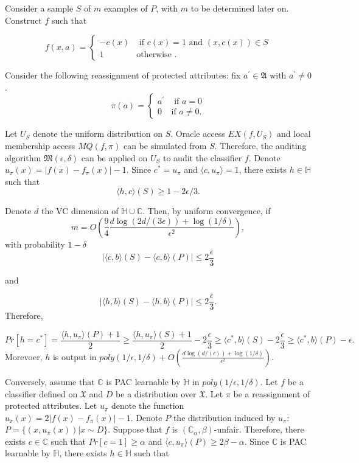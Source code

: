 \documentclass{article}
\begin{document}
\bigskip
Consider a sample $S$ of $m$ examples of $P$, with $m$ to be determined later on. Construct $f$ such that

\begin{equation}
    f(x, a) = \begin{cases}
    -c(x) & \mbox{ if } c(x)=1 \mbox{ and } (x, c(x))\in S  \\
    1 & \mbox{otherwise }.
    \end{cases}
\end{equation}

Consider the following reassignment of protected attributes: fix $a^{'}\in \mathfrak{A}$ with $a^{'}\neq 0$.
\begin{equation}
    \pi(a) = \begin{cases}
    a^{'} & \mbox{ if } a=0  \\
    0 & \mbox{if } a\neq 0.
    \end{cases}
\end{equation}

Let $U_{S}$ denote the uniform distribution on $S$. Oracle access $EX(f, U_{S})$ and local membership access $MQ(f, \pi)$ can be simulated from $S$. Therefore, the auditing algorithm $\mathfrak{M}(\epsilon, \delta)$ can be applied on $U_{S}$ to audit the classifier $f$. Denote $u_{\pi}(x)=|f(x)-f_{\pi}(x)| -1$. Since $c^{*}=u_{\pi}$ and $\langle c, u_{\pi}\rangle =1$, there exists $h\in \mathbb{H}$ such that $$\langle h, c\rangle(S) \geq 1 -2\epsilon/3.$$ 

\bigskip
Denote $d$ the VC dimension of $\mathbb{H}\cup\mathbb{C}$. Then, by uniform convergence, if $$m=O\left(\frac{9}{4}\frac{d\log(2d/(3\epsilon)) + \log(1/\delta)}{\epsilon^{2}}\right),$$
with probability $1-\delta$
$$|\langle c, b\rangle(S) - \langle c, b\rangle(P)| \leq 2\frac{\epsilon}{3} $$

and

$$|\langle h, b\rangle(S) - \langle h, b\rangle(P)| \leq 2\frac{\epsilon}{3}. $$
Therefore,

$$Pr[h=c^{*}]=\frac{\langle h, u_{\pi}\rangle(P) + 1}{2} \geq \frac{\langle h, u_{\pi}\rangle(S)+ 1}{2} - 2\frac{\epsilon}{3}\geq \langle c^{*}, b\rangle(S) - 2\frac{\epsilon}{3}\geq \langle c^{*}, b\rangle(P) - \epsilon.$$
Morevoer, $h$ is output in $poly(1/\epsilon, 1/\delta) + O\left(\frac{d\log(d/(\epsilon)) + \log(1/\delta)}{\epsilon^{2}}\right)$.

\bigskip
Conversely, assume that $\mathbb{C}$ is PAC learnable by $\mathbb{H}$ in $poly(1/\epsilon, 1/\delta)$. Let $f$ be a classifier defined on $\mathfrak{X}$ and $D$ be a distribution over $\mathfrak{X}$.  Let $\pi$ be a reassignment of protected attributes. Let $u_{\pi}$ denote the function $u_{\pi}(x)=2|f(x) -f_{\pi}(x)| - 1$. Denote $P$ the distribution induced by $u_{\pi}$: $P=\{(x, u_{\pi}(x)) | x\sim D\}$. Suppose that $f$ is $(\mathbb{C}_{\alpha}, \beta)$-unfair. Therefore, there exists $c\in\mathbb{C}$ such that $Pr[c=1] \geq \alpha$ and  $\langle c, u_{\pi}\rangle (P) \geq 2\beta -\alpha$.  Since $\mathbb{C}$ is PAC learnable by $\mathbb{H}$, there exists $h\in \mathbb{H}$ such that 
\end{document}
